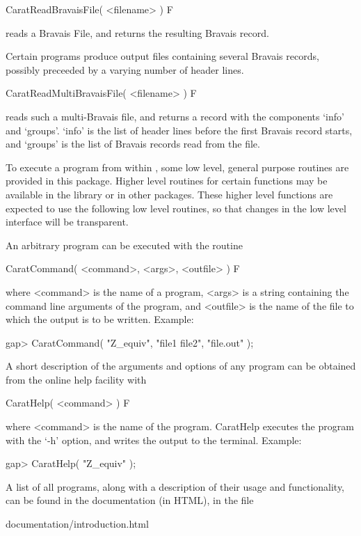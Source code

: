 \>CaratReadBravaisFile( <filename> ) F

reads a Bravais File, and returns the resulting Bravais record.

Certain {\CARAT} programs produce output files containing several Bravais 
records, possibly preceeded by a varying number of header lines.

\>CaratReadMultiBravaisFile( <filename> ) F

reads such a multi-Bravais file, and returns a record with the components
`info' and `groups'. `info' is the list of header lines before the first
Bravais record starts, and `groups' is the list of Bravais records read from
the file.


To execute a {\CARAT} program from within {\GAP}, some low level,
general purpose routines are provided in this package. 
Higher level routines for certain {\CARAT} functions may be available 
in the {\GAP} library or in other packages. These higher
level functions are expected to use the following low level routines,
so that changes in the low level interface will be transparent. 

An arbitrary {\CARAT} program can be executed with the routine

\>CaratCommand( <command>, <args>, <outfile> ) F

where <command> is the name of a {\CARAT} program, <args> is a string
containing the command line arguments of the {\CARAT} program,
and <outfile> is the name of the file to which the output is to be 
written. Example:

\begintt
gap> CaratCommand( "Z_equiv", "file1 file2", "file.out" );
\endtt

A short description of the arguments and options of any {\CARAT} 
program can be obtained from the {\CARAT} online help facility with

\>CaratHelp( <command> ) F

where <command> is the name of the {\CARAT} program. CaratHelp executes
the program with the `-h' option, and writes the output to the 
terminal. Example:

\begintt
gap> CaratHelp( "Z_equiv" );
\endtt

A list of all {\CARAT} programs, along with a description of their
usage and functionality, can be found in the {\CARAT} documentation 
(in HTML), in the file

\begintt
documentation/introduction.html
\endtt

